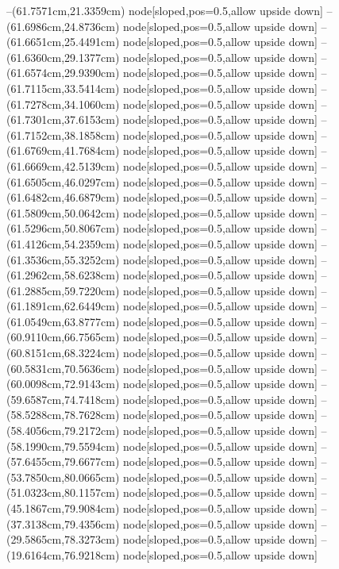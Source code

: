 --(61.7571cm,21.3359cm) node[sloped,pos=0.5,allow upside down]{\arrowIn}
--(61.6986cm,24.8736cm) node[sloped,pos=0.5,allow upside down]{\ArrowIn}
--(61.6651cm,25.4491cm) node[sloped,pos=0.5,allow upside down]{\arrowIn}
--(61.6360cm,29.1377cm) node[sloped,pos=0.5,allow upside down]{\ArrowIn}
--(61.6574cm,29.9390cm) node[sloped,pos=0.5,allow upside down]{\arrowIn}
--(61.7115cm,33.5414cm) node[sloped,pos=0.5,allow upside down]{\ArrowIn}
--(61.7278cm,34.1060cm) node[sloped,pos=0.5,allow upside down]{\arrowIn}
--(61.7301cm,37.6153cm) node[sloped,pos=0.5,allow upside down]{\ArrowIn}
--(61.7152cm,38.1858cm) node[sloped,pos=0.5,allow upside down]{\arrowIn}
--(61.6769cm,41.7684cm) node[sloped,pos=0.5,allow upside down]{\ArrowIn}
--(61.6669cm,42.5139cm) node[sloped,pos=0.5,allow upside down]{\arrowIn}
--(61.6505cm,46.0297cm) node[sloped,pos=0.5,allow upside down]{\ArrowIn}
--(61.6482cm,46.6879cm) node[sloped,pos=0.5,allow upside down]{\arrowIn}
--(61.5809cm,50.0642cm) node[sloped,pos=0.5,allow upside down]{\ArrowIn}
--(61.5296cm,50.8067cm) node[sloped,pos=0.5,allow upside down]{\arrowIn}
--(61.4126cm,54.2359cm) node[sloped,pos=0.5,allow upside down]{\ArrowIn}
--(61.3536cm,55.3252cm) node[sloped,pos=0.5,allow upside down]{\ArrowIn}
--(61.2962cm,58.6238cm) node[sloped,pos=0.5,allow upside down]{\ArrowIn}
--(61.2885cm,59.7220cm) node[sloped,pos=0.5,allow upside down]{\ArrowIn}
--(61.1891cm,62.6449cm) node[sloped,pos=0.5,allow upside down]{\ArrowIn}
--(61.0549cm,63.8777cm) node[sloped,pos=0.5,allow upside down]{\ArrowIn}
--(60.9110cm,66.7565cm) node[sloped,pos=0.5,allow upside down]{\ArrowIn}
--(60.8151cm,68.3224cm) node[sloped,pos=0.5,allow upside down]{\ArrowIn}
--(60.5831cm,70.5636cm) node[sloped,pos=0.5,allow upside down]{\ArrowIn}
--(60.0098cm,72.9143cm) node[sloped,pos=0.5,allow upside down]{\ArrowIn}
--(59.6587cm,74.7418cm) node[sloped,pos=0.5,allow upside down]{\ArrowIn}
--(58.5288cm,78.7628cm) node[sloped,pos=0.5,allow upside down]{\ArrowIn}
--(58.4056cm,79.2172cm) node[sloped,pos=0.5,allow upside down]{\arrowIn}
--(58.1990cm,79.5594cm) node[sloped,pos=0.5,allow upside down]{\arrowIn}
--(57.6455cm,79.6677cm) node[sloped,pos=0.5,allow upside down]{\arrowIn}
--(53.7850cm,80.0665cm) node[sloped,pos=0.5,allow upside down]{\ArrowIn}
--(51.0323cm,80.1157cm) node[sloped,pos=0.5,allow upside down]{\ArrowIn}
--(45.1867cm,79.9084cm) node[sloped,pos=0.5,allow upside down]{\ArrowIn}
--(37.3138cm,79.4356cm) node[sloped,pos=0.5,allow upside down]{\ArrowIn}
--(29.5865cm,78.3273cm) node[sloped,pos=0.5,allow upside down]{\ArrowIn}
--(19.6164cm,76.9218cm) node[sloped,pos=0.5,allow upside down]{\ArrowIn}
